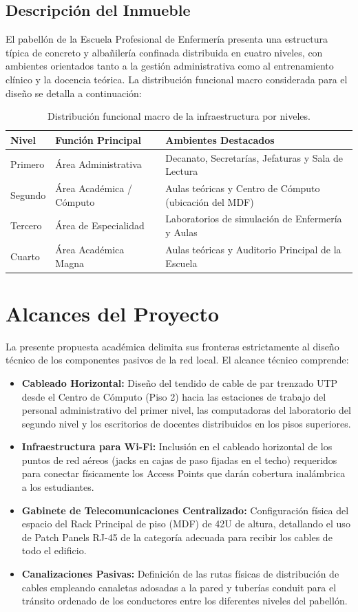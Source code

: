 \subsection{Descripción del Inmueble}
El pabellón de la Escuela Profesional de Enfermería presenta una estructura típica de concreto y albañilería confinada distribuida en cuatro niveles, con ambientes orientados tanto a la gestión administrativa como al entrenamiento clínico y la docencia teórica.
La distribución funcional macro considerada para el diseño se detalla a continuación:

\begin{table}[H]
\centering
\caption{Distribución funcional macro de la infraestructura por niveles.}
\begin{tabular}{llp{6.5cm}}
\hline
\textbf{Nivel} & \textbf{Función Principal} & \textbf{Ambientes Destacados} \\
\hline
Primero & Área Administrativa & Decanato, Secretarías, Jefaturas y Sala de Lectura \\
Segundo & Área Académica / Cómputo & Aulas teóricas y Centro de Cómputo (ubicación del MDF) \\
Tercero & Área de Especialidad & Laboratorios de simulación de Enfermería y Aulas \\
Cuarto & Área Académica Magna & Aulas teóricas y Auditorio Principal de la Escuela \\
\hline
\end{tabular}
\end{table}

\section{Alcances del Proyecto}
La presente propuesta académica delimita sus fronteras estrictamente al diseño técnico de los componentes pasivos de la red local. El alcance técnico comprende:
\begin{itemize}[label=$\bullet$,leftmargin=1.4em]
    \item \textbf{Cableado Horizontal:} Diseño del tendido de cable de par trenzado UTP desde el Centro de Cómputo (Piso 2) hacia las estaciones de trabajo del personal administrativo del primer nivel, las computadoras del laboratorio del segundo nivel y los escritorios de docentes distribuidos en los pisos superiores.
    \item \textbf{Infraestructura para Wi-Fi:} Inclusión en el cableado horizontal de los puntos de red aéreos (jacks en cajas de paso fijadas en el techo) requeridos para conectar físicamente los Access Points que darán cobertura inalámbrica a los estudiantes.
    \item \textbf{Gabinete de Telecomunicaciones Centralizado:} Configuración física del espacio del Rack Principal de piso (MDF) de 42U de altura, detallando el uso de Patch Panels RJ-45 de la categoría adecuada para recibir los cables de todo el edificio.
    \item \textbf{Canalizaciones Pasivas:} Definición de las rutas físicas de distribución de cables empleando canaletas adosadas a la pared y tuberías conduit para el tránsito ordenado de los conductores entre los diferentes niveles del pabellón.
\end{itemize}

